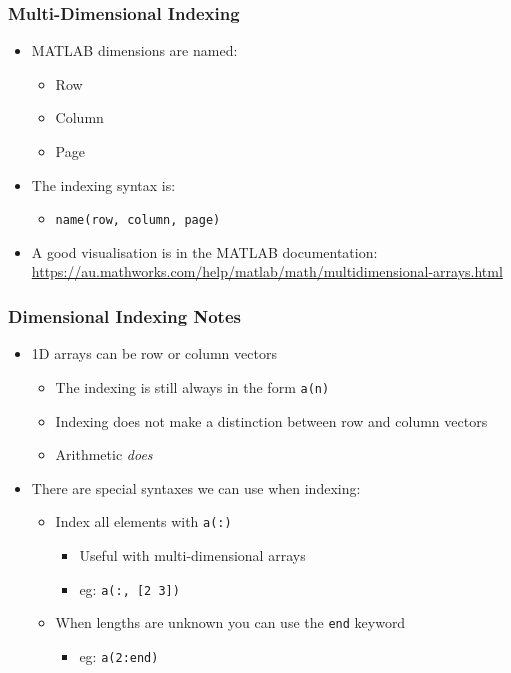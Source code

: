 \documentclass[14pt]{beamer}
\begin{document}
\begin{frame}
\frametitle{Multi-Dimensional Indexing}
\begin{itemize}
\item MATLAB dimensions are named:
	\begin{itemize}
		\item Row
		\item Column
		\item Page
	\end{itemize}
\item The indexing syntax is:
	\begin{itemize}
		\item \texttt{name(row, column, page)}
	\end{itemize}
\item A good visualisation is in the MATLAB documentation: \url{https://au.mathworks.com/help/matlab/math/multidimensional-arrays.html}
\end{itemize}
\end{frame}

\begin{frame}
\frametitle{Dimensional Indexing Notes}
\begin{itemize}
\item 1D arrays can be row or column vectors
	\begin{itemize}
		\item The indexing is still always in the form \texttt{a(n)}
		\item Indexing does not make a distinction between row and column vectors
		\item Arithmetic \textit{does}
	\end{itemize}
\pause
\item There are special syntaxes we can use when indexing:
	\begin{itemize}
		\item Index all elements with \texttt{a(:)}
			\begin{itemize}
				\item Useful with multi-dimensional arrays
				\item eg: \texttt{a(:, [2 3])}
			\end{itemize}
		\item When lengths are unknown you can use the \texttt{end} keyword
			\begin{itemize}
				\item eg: \texttt{a(2:end)}
			\end{itemize}
	\end{itemize}
\end{itemize}
\end{frame}
\end{document}
